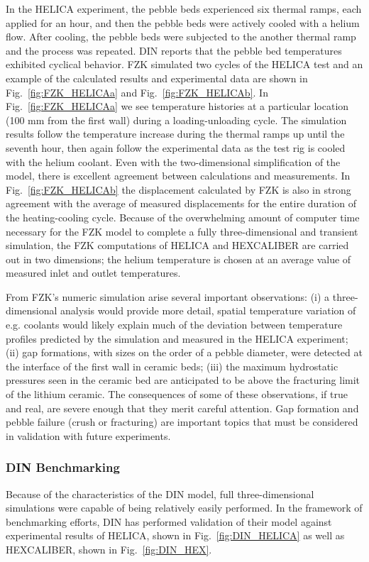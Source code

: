 In the HELICA experiment, the pebble beds experienced six thermal ramps, each applied for an hour, and then the pebble beds were actively cooled with a helium flow. After cooling, the pebble beds were subjected to the another thermal ramp and the process was repeated. DIN reports\cite{dellorco:2006} that the pebble bed temperatures exhibited cyclical behavior. FZK simulated two cycles of the HELICA test and an example of the calculated results and experimental data are shown in Fig.~\ref{fig:FZK_HELICAa} and Fig.~\ref{fig:FZK_HELICAb}. In Fig.~\ref{fig:FZK_HELICAa} we see temperature histories at a particular location (100 mm from the first wall) during a loading-unloading cycle. The simulation results follow the temperature increase during the thermal ramps up until the seventh hour, then again follow the experimental data as the test rig is cooled with the helium coolant. Even with the two-dimensional simplification of the model, there is excellent agreement between calculations and measurements. In Fig.~\ref{fig:FZK_HELICAb} the displacement calculated by FZK is also in strong agreement with the average of measured displacements for the entire duration of the heating-cooling cycle. Because of the overwhelming amount of computer time necessary for the FZK model to complete a fully three-dimensional and transient simulation, the FZK computations of HELICA and HEXCALIBER are carried out in two dimensions; the helium temperature is chosen at an average value of measured inlet and outlet temperatures.

From FZK's numeric simulation arise several important observations: (i) a three-dimensional analysis would provide more detail, spatial temperature variation of e.g. coolants would likely explain much of the deviation between temperature profiles predicted by the simulation and measured in the HELICA experiment; (ii) gap formations, with sizes on the order of a pebble diameter, were detected at the interface of the first wall in ceramic beds; (iii) the maximum hydrostatic pressures seen in the ceramic bed are anticipated to be above the fracturing limit of the lithium ceramic. The consequences of some of these observations, if true and real, are severe enough that they merit careful attention. Gap formation and pebble failure (crush or fracturing) are important topics that must be considered in validation with future experiments.

\subsubsection{DIN Benchmarking}
Because of the characteristics of the DIN model, full three-dimensional simulations were capable of being relatively easily performed. In the framework of benchmarking efforts, DIN has performed validation of their model against experimental results of HELICA, shown in Fig.~\ref{fig:DIN_HELICA} as well as HEXCALIBER, shown in Fig.~\ref{fig:DIN_HEX}.

